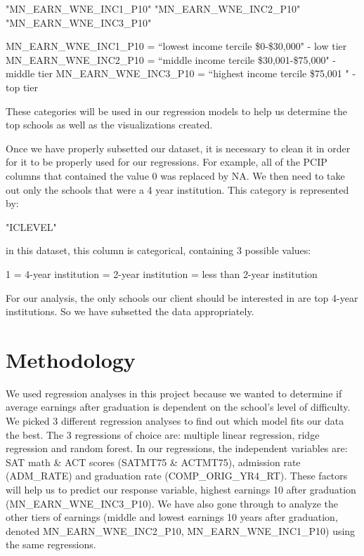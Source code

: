 \documentclass{article}
\begin{document}
\begin{Schunk}
\begin{Soutput}
[1] "MN_EARN_WNE_INC1_P10" "MN_EARN_WNE_INC2_P10" "MN_EARN_WNE_INC3_P10"
\end{Soutput}
\end{Schunk}
\begin{flushleft}
MN\_EARN\_WNE\_INC1\_P10 = ``lowest income tercile \$0-\$30,000" - low tier \newline
MN\_EARN\_WNE\_INC2\_P10 = ``middle income tercile \$30,001-\$75,000" - middle tier \newline
MN\_EARN\_WNE\_INC3\_P10 = ``highest income tercile \$75,001  " - top tier \newline
\end{flushleft}
These categories will be used in our regression models to help us determine the top schools as well as the visualizations created.

  Once we have properly subsetted our dataset, it is necessary to clean it in order for it to be properly used for our regressions.  For example, all of the PCIP columns that contained the value 0 was replaced by NA.  We then need to take out only the schools that were a 4 year institution.  This category is represented by:
\begin{Schunk}
\begin{Soutput}
[1] "ICLEVEL"
\end{Soutput}
\end{Schunk}
in this dataset, this column is categorical, containing 3 possible values: 
  \begin{flushleft}
  1 = 4-year institution  = 2-year institution  = less than 2-year institution \newline
  \end{flushleft}
  For our analysis, the only schools our client should be interested in are top 4-year institutions.  So we have subsetted the data appropriately.

\section{Methodology}

  We used regression analyses in this project because we wanted to determine if average earnings after graduation is dependent on the school's level of difficulty.  
We picked 3 different regression analyses to find out which model fits our data the best.  
The 3 regressions of choice are: multiple linear regression, ridge regression and random forest.   
In our regressions, the independent variables are: SAT  math \& ACT scores (SATMT75 \& ACTMT75), admission rate (ADM\_RATE) and graduation rate (COMP\_ORIG\_YR4\_RT).   These factors will help us to predict our 
response variable, highest earnings 10 after graduation (MN\_EARN\_WNE\_INC3\_P10).  We have also gone through to analyze the other tiers of earnings (middle and lowest earnings 10 years after graduation, denoted MN\_EARN\_WNE\_INC2\_P10, MN\_EARN\_WNE\_INC1\_P10) using the same regressions.  
\end{document}
